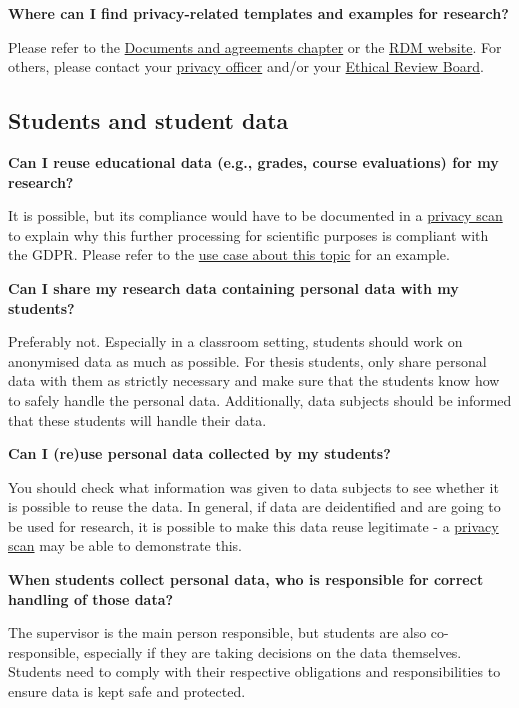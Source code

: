 \documentclass[
]{book}
\begin{document}
\textbf{Where can I find privacy-related templates and examples for research?}

Please refer to the \protect\hyperlink{legal-documents}{Documents and agreements chapter} or the \href{https://www.uu.nl/rdm}{RDM website}. For others, please contact your \href{https://intranet.uu.nl/en/knowledgebase/privacyofficers}{privacy officer} and/or your \href{https://intranet.uu.nl/en/knowledgebase/ethics-assessment}{Ethical Review Board}.

\hypertarget{students}{%
\subsection{Students and student data}\label{students}}

\textbf{Can I reuse educational data (e.g., grades, course evaluations) for my research?}

It is possible, but its compliance would have to be documented in a \protect\hyperlink{privacy-scan}{privacy scan} to explain why this further processing for scientific purposes is compliant with the GDPR. Please refer to the \protect\hyperlink{reuse-education-data}{use case about this topic} for an example.

\textbf{Can I share my research data containing personal data with my students?}

Preferably not. Especially in a classroom setting, students should work on anonymised data as much as possible. For thesis students, only share personal data with them as strictly necessary and make sure that the students know how to safely handle the personal data. Additionally, data subjects should be informed that these students will handle their data.

\textbf{Can I (re)use personal data collected by my students?}

You should check what information was given to data subjects to see whether it is possible to reuse the data. In general, if data are deidentified and are going to be used for research, it is possible to make this data reuse legitimate - a \protect\hyperlink{privacy-scan}{privacy scan} may be able to demonstrate this.

\textbf{When students collect personal data, who is responsible for correct handling of those data? }

The supervisor is the main person responsible, but students are also co-responsible, especially if they are taking decisions on the data themselves. Students need to comply with their respective obligations and responsibilities to ensure data is kept safe and protected.
\end{document}
